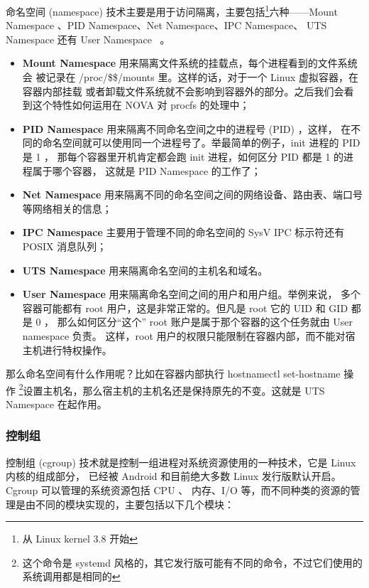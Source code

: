 命名空间 (namespace) 技术主要是用于访问隔离，主要包括\footnote{从 Linux kernel
 3.8 开始}六种——Mount Namespace 、PID Namespace、Net Namespace、IPC Namespace、
UTS Namespace 还有 User Namespace ~\cite{docker-in-practice}。

\begin{itemize}
    \item \textbf{Mount Namespace} 用来隔离文件系统的挂载点，每个进程看到的文件系统会
    被记录在 /proc/\$\$/mounts 里。这样的话，对于一个 Linux 虚拟容器，在容器内部挂载
    或者卸载文件系统就不会影响到容器外的部分。之后我们会看到这个特性如何运用在 NOVA 对
    procfs 的处理中；
    \item \textbf{PID Namespace} 用来隔离不同命名空间之中的进程号 (PID) ，这样，
    在不同的命名空间就可以使用同一个进程号了。举最简单的例子，init 进程的 PID 是 1 ，
    那每个容器里开机肯定都会跑 init 进程，如何区分 PID 都是 1 的进程属于哪个容器，
    这就是 PID Namespace 的工作了；
    \item \textbf{Net Namespace} 用来隔离不同的命名空间之间的网络设备、路由表、端口号
    等网络相关的信息；
    \item \textbf{IPC Namespace} 主要用于管理不同的命名空间的 SysV IPC 标示符还有
    POSIX 消息队列；
    \item \textbf{UTS Namespace} 用来隔离命名空间的主机名和域名。
    \item \textbf{User Namespace} 用来隔离命名空间之间的用户和用户组。举例来说，
    多个容器可能都有 root 用户，这是非常正常的。但凡是 root 它的 UID 和 GID 都是 0 ，
    那么如何区分“这个” root 账户是属于那个容器的这个任务就由 User namespace 负责。
    这样，root 用户的权限只能限制在容器内部，而不能对宿主机进行特权操作。
\end{itemize}

那么命名空间有什么作用呢？比如在容器内部执行 hostnamectl set-hostname 操作
\footnote{这个命令是 systemd 风格的，其它发行版可能有不同的命令，不过它们使用的
系统调用都是相同的}设置主机名，那么宿主机的主机名还是保持原先的不变。这就是 UTS Namespace
在起作用。

\subsubsection{控制组}
\label{subsubsec:cgroup}

控制组 (cgroup) 技术就是控制一组进程对系统资源使用的一种技术，它是 Linux 内核的组成部分，
已经被 Android 和目前绝大多数 Linux 发行版默认开启。Cgroup 可以管理的系统资源包括 CPU 、
内存、I/O 等，而不同种类的资源的管理是由不同的模块实现的，主要包括以下几个模块：


